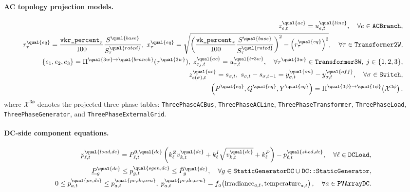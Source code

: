 \paragraph{AC topology projection models.}
\begin{align}
z^{\qual{ac}}_{e,t}=u^{\qual{line}}_{e,t},
\quad \forall e\in\texttt{ACBranch},
\label{eq:tstr-comp-branch}
\\
r^{\qual{eq}}_{\tau} =
\frac{\texttt{vkr\_percent}_\tau}{100}\frac{S^{\qual{base}}}{S^{\qual{rated}}_\tau},\;
x^{\qual{eq}}_{\tau} =
\sqrt{\left(\frac{\texttt{vk\_percent}_\tau}{100}\frac{S^{\qual{base}}}{S^{\qual{rated}}_\tau}\right)^2
-\left(r^{\qual{eq}}_{\tau}\right)^2},
\quad \forall \tau\in\texttt{Transformer2W},
\label{eq:tstr-comp-transformer2w}
\\
\{e_1,e_2,e_3\}=\Pi^{\qual{3w}\rightarrow\qual{branch}}(\tau^{\qual{3w}}),\;
z^{\qual{ac}}_{e_j,t}=u^{\qual{tr3w}}_{\tau,t},
\quad \forall \tau^{\qual{3w}}\in\texttt{Transformer3W},\;j\in\{1,2,3\},
\label{eq:tstr-comp-transformer3w}
\\
z^{\qual{ac}}_{e(\sigma),t}=s_{\sigma,t},\;
s_{\sigma,t}-s_{\sigma,t-1}=y^{\qual{on}}_{\sigma,t}-y^{\qual{off}}_{\sigma,t},
\quad \forall \sigma\in\texttt{Switch},
\label{eq:tstr-comp-switch}
\\
\left(P^{\qual{eq}},Q^{\qual{eq}},Y^{\qual{eq}}\right)
=\Pi^{\qual{3\phi}\rightarrow\qual{1\phi}}\!\left(\mathcal{X}^{3\phi}\right).
\label{eq:tstr-comp-threephase-proj}
\end{align}
where \(\mathcal{X}^{3\phi}\) denotes the projected three-phase tables:
\texttt{ThreePhaseACBus}, \texttt{ThreePhaseACLine},
\texttt{ThreePhaseTransformer}, \texttt{ThreePhaseLoad},
\texttt{ThreePhaseGenerator}, and \texttt{ThreePhaseExternalGrid}.

\paragraph{DC-side component equations.}
\begin{align}
p^{\qual{load,dc}}_{\ell,t}=
P^{0,\qual{dc}}_{\ell,t}
\left(
k^Z_{\ell}v^{\qual{dc}}_{k,t}
+k^I_{\ell}\sqrt{v^{\qual{dc}}_{k,t}}
+k^P_{\ell}
\right)
-p^{\qual{shed,dc}}_{\ell,t},
\quad \forall \ell\in\texttt{DCLoad},
\label{eq:tstr-comp-dcload}
\\
\underline P_g^{\qual{dc}}\le p^{\qual{sgen,dc}}_{g,t}\le \bar P_g^{\qual{dc}},
\quad \forall g\in\texttt{StaticGeneratorDC}\cup\texttt{DC::StaticGenerator},
\label{eq:tstr-comp-dcgen}
\\
0\le p^{\qual{pv,dc}}_{a,t}\le p^{\qual{pv,dc,ava}}_{a,t},\;
p^{\qual{pv,dc,ava}}_{a,t}=f_a\!\left(\text{irradiance}_{a,t},\text{temperature}_{a,t}\right),
\quad \forall a\in\texttt{PVArrayDC}.
\label{eq:tstr-comp-pvdc}
\end{align}

